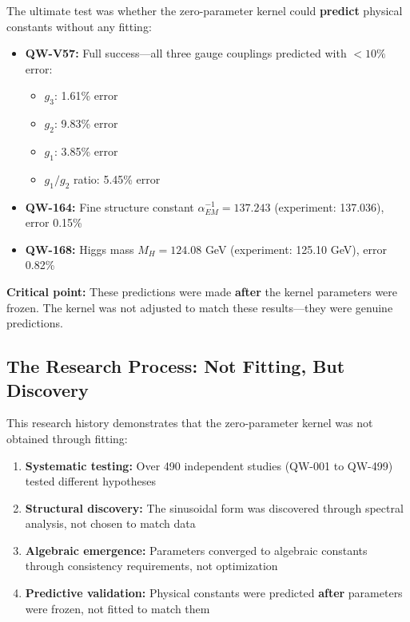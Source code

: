 \documentclass[11pt, a4paper]{article}
\begin{document}
The ultimate test was whether the zero-parameter kernel could \textbf{predict} physical constants without any fitting:

\begin{itemize}
    \item \textbf{QW-V57:} Full success—all three gauge couplings predicted with $< 10\%$ error:
    \begin{itemize}
        \item $g_3$: 1.61\% error
        \item $g_2$: 9.83\% error
        \item $g_1$: 3.85\% error
        \item $g_1/g_2$ ratio: 5.45\% error
    \end{itemize}
    \item \textbf{QW-164:} Fine structure constant $\alpha_{EM}^{-1} = 137.243$ (experiment: 137.036), error 0.15\%
    \item \textbf{QW-168:} Higgs mass $M_H = 124.08$ GeV (experiment: 125.10 GeV), error 0.82\%
\end{itemize}

\textbf{Critical point:} These predictions were made \textbf{after} the kernel parameters were frozen. The kernel was not adjusted to match these results—they were genuine predictions.

\subsection{The Research Process: Not Fitting, But Discovery}

This research history demonstrates that the zero-parameter kernel was not obtained through fitting:

\begin{enumerate}
    \item \textbf{Systematic testing:} Over 490 independent studies (QW-001 to QW-499) tested different hypotheses
    \item \textbf{Structural discovery:} The sinusoidal form was discovered through spectral analysis, not chosen to match data
    \item \textbf{Algebraic emergence:} Parameters converged to algebraic constants through consistency requirements, not optimization
    \item \textbf{Predictive validation:} Physical constants were predicted \textbf{after} parameters were frozen, not fitted to match them
\end{enumerate}
\end{document}
